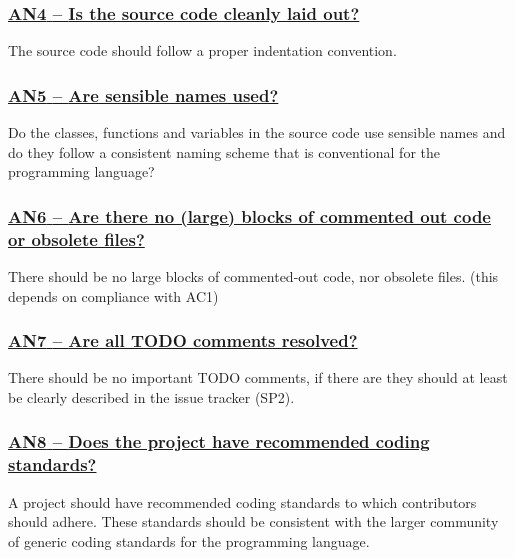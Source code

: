 \documentclass[a4paper,11pt]{article}
\newcommand{\indicator}[1]{\subsubsection*{\underline{#1}}}
\begin{document}
\newcommand{\anFourName}{AN4}
\newcommand{\anFourID}{\anFourName}
\newcommand{\anFourText}{Is the source code cleanly laid out?}
\indicator{\anFourName{ }--{ }\anFourText}\label{id:an4} 

The source code should follow a proper indentation convention. 

\newcommand{\anFiveName}{AN5}
\newcommand{\anFiveID}{\anFiveName}
\newcommand{\anFiveText}{Are sensible names used?}
\indicator{\anFiveName{ }--{ }\anFiveText}\label{id:an5} 

Do the classes, functions and variables in the source code use sensible names
and do they follow a consistent naming scheme that is conventional for the
programming language?

\newcommand{\anSixName}{AN6}
\newcommand{\anSixID}{\anSixName}
\newcommand{\anSixText}{Are there no (large) blocks of commented out code or obsolete files?}
\indicator{\anSixName{ }--{ }\anSixText}\label{id:an6} 

There should be no large blocks of commented-out code, nor obsolete files.
(this depends on compliance with AC1)

\newcommand{\anSevenName}{AN7}
\newcommand{\anSevenID}{\anSevenName}
\newcommand{\anSevenText}{Are all TODO comments resolved?}
\indicator{\anSevenName{ }--{ }\anSevenText}\label{id:an7} 

There should be no important TODO comments, if there are they should at least be
clearly described in the issue tracker (SP2).

\newcommand{\anEightName}{AN8}
\newcommand{\anEightID}{\anEightName}
\newcommand{\anEightText}{Does the project have recommended coding standards?}
\indicator{\anEightName{ }--{ }\anEightText}\label{id:an8} 

A project should have recommended coding standards to which contributors
should adhere. These standards should be consistent with the larger community
of generic coding standards for the programming language.
\end{document}
